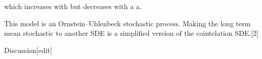 {} {}
which increases with {\displaystyle \sigma } \sigma  but decreases with {\displaystyle a} a.

This model is an Ornstein–Uhlenbeck stochastic process. Making the long term mean stochastic to another SDE is a simplified version of the cointelation SDE.[2]

Discussion[edit]
